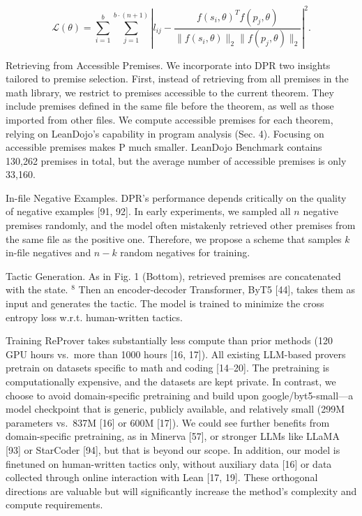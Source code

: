 \documentclass[
]{article}
\begin{document}
\[
\mathcal {L} (\theta) = \sum_ {i = 1} ^ {b} \sum_ {j = 1} ^ {b \cdot (n + 1)} \left| l _ {i j} - \frac {f \left(s _ {i} , \theta\right) ^ {T} f \left(p _ {j} , \theta\right)}{\| f \left(s _ {i} , \theta\right) \| _ {2} \| f \left(p _ {j} , \theta\right) \| _ {2}} \right| ^ {2}. \tag {1}
\]

Retrieving from Accessible Premises. We incorporate into DPR two
insights tailored to premise selection. First, instead of retrieving
from all premises in the math library, we restrict to premises
accessible to the current theorem. They include premises defined in the
same file before the theorem, as well as those imported from other
files. We compute accessible premises for each theorem, relying on
LeanDojo's capability in program analysis (Sec. 4). Focusing on
accessible premises makes P much smaller. LeanDojo Benchmark contains
130,262 premises in total, but the average number of accessible premises
is only 33,160.

In-file Negative Examples. DPR's performance depends critically on the
quality of negative examples {[}91, 92{]}. In early experiments, we
sampled all \(n\) negative premises randomly, and the model often
mistakenly retrieved other premises from the same file as the positive
one. Therefore, we propose a scheme that samples \(k\) in-file negatives
and \(n - k\) random negatives for training.

Tactic Generation. As in Fig. 1 (Bottom), retrieved premises are
concatenated with the state. \(^{8}\) Then an encoder-decoder
Transformer, ByT5 {[}44{]}, takes them as input and generates the
tactic. The model is trained to minimize the cross entropy loss w.r.t.
human-written tactics.

Training ReProver takes substantially less compute than prior methods
(120 GPU hours vs.~more than 1000 hours {[}16, 17{]}). All existing
LLM-based provers pretrain on datasets specific to math and coding
{[}14--20{]}. The pretraining is computationally expensive, and the
datasets are kept private. In contrast, we choose to avoid
domain-specific pretraining and build upon google/byt5-small---a model
checkpoint that is generic, publicly available, and relatively small
(299M parameters vs.~837M {[}16{]} or 600M {[}17{]}). We could see
further benefits from domain-specific pretraining, as in Minerva
{[}57{]}, or stronger LLMs like LLaMA {[}93{]} or StarCoder {[}94{]},
but that is beyond our scope. In addition, our model is finetuned on
human-written tactics only, without auxiliary data {[}16{]} or data
collected through online interaction with Lean {[}17, 19{]}. These
orthogonal directions are valuable but will significantly increase the
method's complexity and compute requirements.
\end{document}

